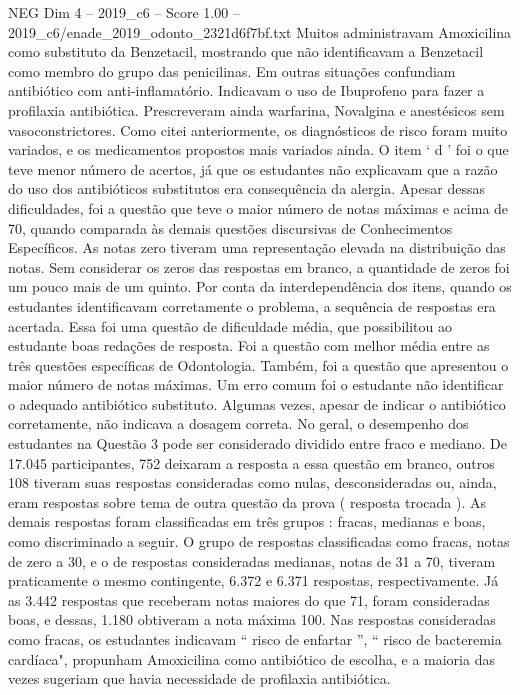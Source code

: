 \begin{textsample}{NEG Dim 4 – 2019\_c6 – Score 1.00 – 2019\_c6/enade\_2019\_odonto\_2321d6f7bf.txt}
Muitos administravam Amoxicilina como substituto da Benzetacil, mostrando que não identificavam a Benzetacil como membro do grupo das penicilinas.
Em outras situações confundiam antibiótico com anti-inflamatório.
Indicavam o uso de Ibuprofeno para fazer a profilaxia antibiótica.
Prescreveram ainda warfarina, Novalgina e anestésicos sem vasoconstrictores.
Como citei anteriormente, os diagnósticos de risco foram muito variados, e os medicamentos propostos mais variados ainda.
O item ‘ d ’ foi o que teve menor número de acertos, já que os estudantes não explicavam que a razão do uso dos antibióticos substitutos era consequência da alergia.
Apesar dessas dificuldades, foi a questão que teve o maior número de notas máximas e acima de 70, quando comparada às demais questões discursivas de Conhecimentos Específicos.
As notas zero tiveram uma representação elevada na distribuição das notas.
Sem considerar os zeros das respostas em branco, a quantidade de zeros foi um pouco mais de um quinto.
Por conta da interdependência dos itens, quando os estudantes identificavam corretamente o problema, a sequência de respostas era acertada.
Essa foi uma questão de dificuldade média, que possibilitou ao estudante boas redações de resposta.
Foi a questão com melhor média entre as três questões específicas de Odontologia.
Também, foi a questão que apresentou o maior número de notas máximas.
Um erro comum foi o estudante não identificar o adequado antibiótico substituto.
Algumas vezes, apesar de indicar o antibiótico corretamente, não indicava a dosagem correta.
No geral, o desempenho dos estudantes na Questão 3 pode ser considerado dividido entre fraco e mediano.
De 17.045 participantes, 752 deixaram a resposta a essa questão em branco, outros 108 tiveram suas respostas consideradas como nulas, desconsideradas ou, ainda, eram respostas sobre tema de outra questão da prova ( resposta trocada ).
As demais respostas foram classificadas em três grupos : fracas, medianas e boas, como discriminado a seguir.
O grupo de respostas classificadas como fracas, notas de zero a 30, e o de respostas consideradas medianas, notas de 31 a 70, tiveram praticamente o mesmo contingente, 6.372 e 6.371 respostas, respectivamente.
Já as 3.442 respostas que receberam notas maiores do que 71, foram consideradas boas, e dessas, 1.180 obtiveram a nota máxima 100.
Nas respostas consideradas como fracas, os estudantes indicavam “ risco de enfartar ”, “ risco de bacteremia cardíaca", propunham Amoxicilina como antibiótico de escolha, e a maioria das vezes sugeriam que havia necessidade de profilaxia antibiótica.

\end{textsample}
